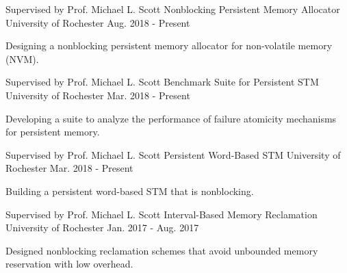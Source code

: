 

\begin{cventries}

  \cventry
    {Supervised by Prof. Michael L. Scott} %
    {Nonblocking Persistent Memory Allocator} %
    {University of Rochester} %
    {Aug. 2018 - Present} %
    {
      \begin{cvitems} %
        \item {Designing a nonblocking persistent memory allocator for non-volatile memory (NVM).}
      \end{cvitems}
	}

  \cventry
    {Supervised by Prof. Michael L. Scott} %
    {Benchmark Suite for Persistent STM} %
    {University of Rochester} %
    {Mar. 2018 - Present} %
    {
      \begin{cvitems} %
        \item {Developing a suite to analyze the performance of failure atomicity mechanisms for persistent memory.}
      \end{cvitems}
    }

  \cventry
    {Supervised by Prof. Michael L. Scott} %
    {Persistent Word-Based STM} %
    {University of Rochester} %
    {Mar. 2018 - Present} %
    {
      \begin{cvitems} %
        \item {Building a persistent word-based STM that is nonblocking.}
      \end{cvitems}
    }

  \cventry
    {Supervised by Prof. Michael L. Scott} %
    {Interval-Based Memory Reclamation} %
    {University of Rochester} %
    {Jan. 2017 - Aug. 2017} %
    {
      \begin{cvitems} %
        \item {Designed nonblocking reclamation schemes that avoid unbounded memory reservation with low overhead.}
      \end{cvitems}
    }


\end{cventries}
